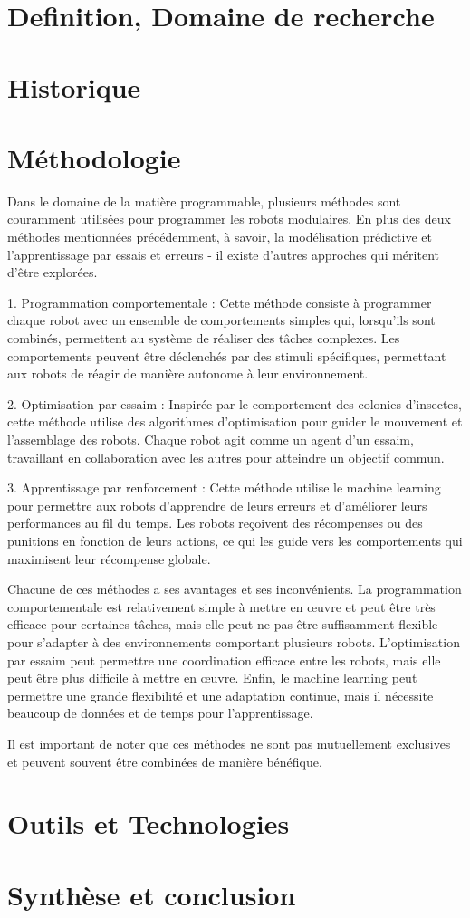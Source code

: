 \documentclass{article}
\begin{document}
\section{Definition, Domaine de recherche}

\section{Historique}

\section{Méthodologie}

Dans le domaine de la matière programmable, plusieurs méthodes sont couramment
utilisées pour programmer les robots modulaires. En plus des deux méthodes
mentionnées précédemment, à savoir, la modélisation prédictive
et l'apprentissage par essais et erreurs - il existe d'autres approches qui
méritent d'être explorées.

1. Programmation comportementale : Cette méthode consiste à programmer chaque
robot avec un ensemble de comportements simples qui, lorsqu'ils sont combinés,
permettent au système de réaliser des tâches complexes. Les comportements
peuvent être déclenchés par des stimuli spécifiques, permettant aux robots de
réagir de manière autonome à leur environnement.

2. Optimisation par essaim : Inspirée par le comportement des colonies
d'insectes, cette méthode utilise des algorithmes d'optimisation pour guider le
mouvement et l'assemblage des robots. Chaque robot agit comme un agent d'un
essaim, travaillant en collaboration avec les autres pour atteindre un objectif
commun.

3. Apprentissage par renforcement : Cette méthode utilise le machine learning pour permettre aux robots d'apprendre de leurs erreurs et d'améliorer
leurs performances au fil du temps. Les robots reçoivent des récompenses ou des
punitions en fonction de leurs actions, ce qui les guide vers les comportements
qui maximisent leur récompense globale.

Chacune de ces méthodes a ses avantages et ses inconvénients. La programmation
comportementale est relativement simple à mettre en œuvre et peut être très
efficace pour certaines tâches, mais elle peut ne pas être suffisamment flexible
pour s'adapter à des environnements comportant plusieurs robots. L'optimisation par
essaim peut permettre une coordination efficace entre les robots, mais elle peut
être plus difficile à mettre en œuvre. Enfin, le machine learning peut permettre une grande flexibilité et une adaptation continue,
mais il nécessite beaucoup de données et de temps pour l'apprentissage.

Il est important de noter que ces méthodes ne sont pas mutuellement exclusives
et peuvent souvent être combinées de manière bénéfique.

\section{Outils et Technologies}

\section{Synthèse et conclusion}
\end{document}
